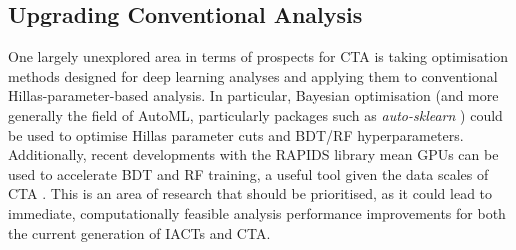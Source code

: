 \subsection{Upgrading Conventional Analysis}
One largely unexplored area in terms of prospects for CTA is taking optimisation methods designed for deep learning analyses and applying them to conventional Hillas-parameter-based analysis. In particular, Bayesian optimisation (and more generally the field of AutoML, particularly packages such as \textit{auto-sklearn} \cite{autosklearn}) could be used to optimise Hillas parameter cuts and BDT/RF hyperparameters. Additionally, recent developments with the RAPIDS \cite{rapids} library mean GPUs can be used to accelerate BDT and RF training, a useful tool given the data scales of CTA \cite{trigrate}. This is an area of research that should be prioritised, as it could lead to immediate, computationally feasible analysis performance improvements for both the current generation of IACTs and CTA.